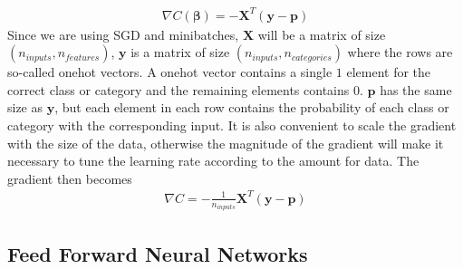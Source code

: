 \documentclass[a4paper,twocolumn]{article}
\newcommand{\y}{\mathbf{y}}
\newcommand{\X}{\mathbf{X}}
\newcommand{\B}{\boldsymbol{\beta}}
\begin{document}
\begin{align}
    \nabla C(\B) = -\X^{T}(\y - \mathbf{p})
\end{align}
Since we are using SGD and minibatches, $\X$ will be a matrix of size $(n_{inputs}, n_{features})$, $\mathbf{y}$ is a matrix of size $(n_{inputs}, n_{categories})$ where the rows are so-called onehot vectors. A onehot vector contains a single $1$ element for the correct class or category and the remaining elements contains 0. $\mathbf{p}$ has the same size as $\y$, but each element in each row contains the probability of each class or category with the corresponding input. It is also convenient to scale the gradient with the size of the data, otherwise the magnitude of the gradient will make it necessary to tune the learning rate according to the amount for data. The gradient then becomes
\begin{align}
    \nabla C = -\frac{1}{n_{inputs}}\X^{T}(\y - \mathbf{p})
\end{align}
\subsection{Feed Forward Neural Networks}
\end{document}
